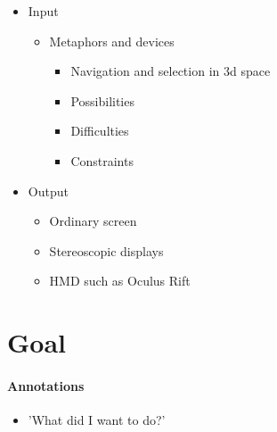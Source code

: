 \begin{itemize}
	\item Input
	\begin{itemize}
		\item Metaphors and devices
		\begin{itemize}
			\item Navigation and selection in 3d space
			\item Possibilities
			\item Difficulties
			\item Constraints
		\end{itemize}
	\end{itemize}
	\item Output
	\begin{itemize}
		\item Ordinary screen
		\item Stereoscopic displays
		\item \ac{HMD} such as Oculus Rift
	\end{itemize}
\end{itemize}


\section{Goal}
\label{motivation_goal}

\paragraph{Annotations}

\begin{itemize}
	\item 'What did I want to do?'
\end{itemize}